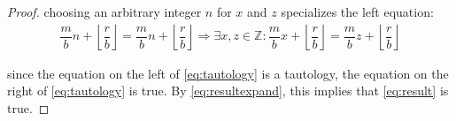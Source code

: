 \documentclass{article}
\begin{document}
\begin{proof}
choosing an arbitrary integer $n$ for $x$ and $z$ specializes the left equation:
\begin{align}
  \dfrac{{m}}{{b}}{n} + \left\lfloor\dfrac{{r}}{{b}}\right\rfloor = \dfrac{{m}}{{b}}{n} + \left\lfloor\dfrac{{r}}{{b}}\right\rfloor \Rightarrow
  \exists {x}, {z} \in \mathbb{Z} : \dfrac{{m}}{{b}}{x} + \left\lfloor\dfrac{{r}}{{b}}\right\rfloor = \dfrac{{m}}{{b}}{z} + \left\lfloor\dfrac{{r}}{{b}}\right\rfloor \label{eq:tautology}
\end{align}

since the equation on the left of \eqref{eq:tautology} is a tautology, the
equation on the right of \eqref{eq:tautology} is true.  By
\eqref{eq:resultexpand}, this implies that \eqref{eq:result} is true.

\end{proof}
\end{document}
